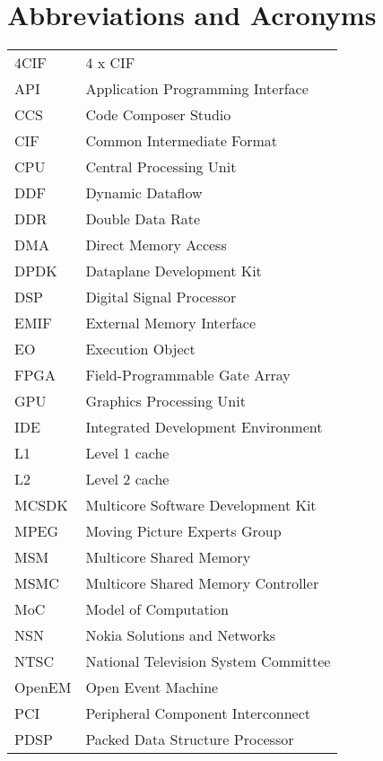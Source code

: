 \chapter*{Abbreviations and Acronyms}


\noindent
\begin{longtable}{@{}p{}p{}@{}}
    4CIF & 4 x CIF \\
    API & Application Programming Interface \\
    CCS & Code Composer Studio \\
    CIF & Common Intermediate Format \\
    CPU & Central Processing Unit \\
    DDF & Dynamic Dataflow \\
    DDR & Double Data Rate \\
    DMA & Direct Memory Access \\
    DPDK & Dataplane Development Kit \\
    DSP & Digital Signal Processor \\
    EMIF & External Memory Interface \\
    EO & Execution Object \\
    FPGA & Field-Programmable Gate Array \\
    GPU & Graphics Processing Unit \\
    IDE & Integrated Development Environment \\
    L1 & Level 1 cache \\
    L2 & Level 2 cache \\
    MCSDK & Multicore Software Development Kit \\
    MPEG & Moving Picture Experts Group \\
    MSM & Multicore Shared Memory \\
    MSMC & Multicore Shared Memory Controller \\
    MoC & Model of Computation \\
    NSN & Nokia Solutions and Networks \\
    NTSC & National Television System Committee \\
    OpenEM & Open Event Machine \\
    PCI & Peripheral Component Interconnect \\
    PDSP & Packed Data Structure Processor \\

\end{longtable}
